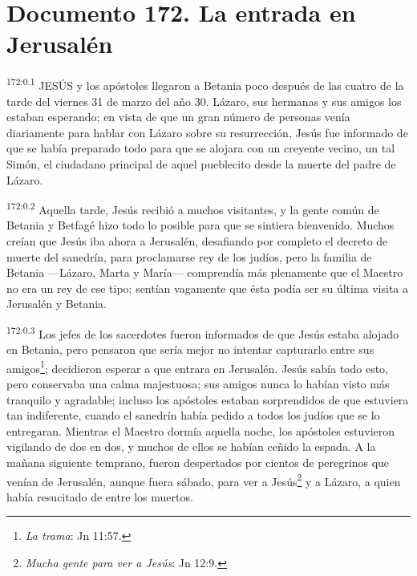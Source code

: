 \chapter{Documento 172. La entrada en Jerusalén}
\par 
\textsuperscript{172:0.1} JESÚS y los apóstoles llegaron a Betania poco después de las cuatro de la tarde del viernes 31 de marzo del año 30. Lázaro, sus hermanas y sus amigos los estaban esperando; en vista de que un gran número de personas venía diariamente para hablar con Lázaro sobre su resurrección, Jesús fue informado de que se había preparado todo para que se alojara con un creyente vecino, un tal Simón, el ciudadano principal de aquel pueblecito desde la muerte del padre de Lázaro.

\par 
\textsuperscript{172:0.2} Aquella tarde, Jesús recibió a muchos visitantes, y la gente común de Betania y Betfagé hizo todo lo posible para que se sintiera bienvenido. Muchos creían que Jesús iba ahora a Jerusalén, desafiando por completo el decreto de muerte del sanedrín, para proclamarse rey de los judíos, pero la familia de Betania ---Lázaro, Marta y María--- comprendía más plenamente que el Maestro no era un rey de ese tipo; sentían vagamente que ésta podía ser su última visita a Jerusalén y Betania.

\par 
\textsuperscript{172:0.3} Los jefes de los sacerdotes fueron informados de que Jesús estaba alojado en Betania, pero pensaron que sería mejor no intentar capturarlo entre sus amigos\footnote{\textit{La trama}: Jn 11:57.}; decidieron esperar a que entrara en Jerusalén. Jesús sabía todo esto, pero conservaba una calma majestuosa; sus amigos nunca lo habían visto más tranquilo y agradable; incluso los apóstoles estaban sorprendidos de que estuviera tan indiferente, cuando el sanedrín había pedido a todos los judíos que se lo entregaran. Mientras el Maestro dormía aquella noche, los apóstoles estuvieron vigilando de dos en dos, y muchos de ellos se habían ceñido la espada. A la mañana siguiente temprano, fueron despertados por cientos de peregrinos que venían de Jerusalén, aunque fuera sábado, para ver a Jesús\footnote{\textit{Mucha gente para ver a Jesús}: Jn 12:9.} y a Lázaro, a quien había resucitado de entre los muertos.

